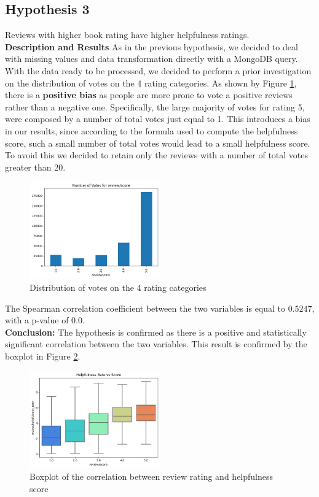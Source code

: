 \subsection*{Hypothesis 3}

Reviews with higher book rating have higher helpfulness ratings.\\

\noindent
\textbf{Description and Results}
As in the previous hypothesis, we decided to deal with missing values and data transformation directly with a MongoDB query. With the data ready to
be processed, we decided to perform a prior investigation on the distribution of votes on the 4 rating categories. As shown by Figure \ref{fig:h3_votes_distribution},
there is a \textbf{positive bias} as people are more prone to vote a positive reviews rather than a negative one. Specifically, the large majority of votes
for rating 5, were composed by a number of total votes just equal to 1. This introduces a bias in our results, since according to the formula used 
to compute the helpfulness score, such a small number of total votes would lead to a small helpfulness score.
To avoid this we decided to retain only the reviews with a number of total votes greater than 20.

\begin{figure}[H]
    \centering
    \includegraphics[width=0.5\textwidth]{./figures/h3_votes_distribution.png}
    \caption{Distribution of votes on the 4 rating categories}
    \label{fig:h3_votes_distribution}
\end{figure}
\noindent 
The Spearman correlation coefficient between the two variables is equal to $0.5247$, with a p-value of $0.0$. \\
\textbf{Conclusion:}
The hypothesis is confirmed as there is a positive and statistically significant correlation between the two variables. This result is confirmed by 
the boxplot in Figure \ref{fig:h3_boxplot}.

\begin{figure}[H]
    \centering
    \includegraphics[width=0.5\textwidth]{./figures/h3_boxplot.png}
    \caption{Boxplot of the correlation between review rating and helpfulness score}
    \label{fig:h3_boxplot}
\end{figure}